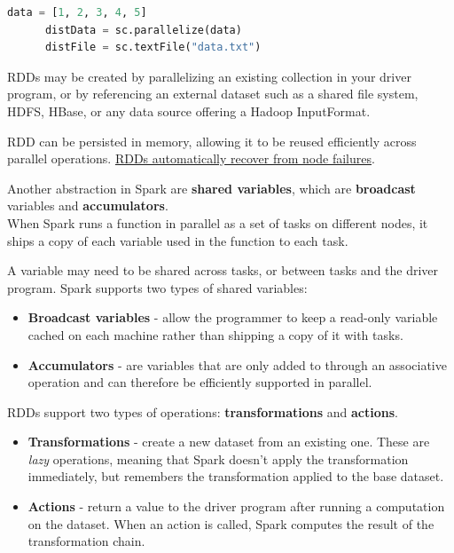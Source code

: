 \begin{paracol}{2}
   \begin{lstlisting}[language=Python, caption={Creating an RDD}]
      data = [1, 2, 3, 4, 5]
      distData = sc.parallelize(data)
      distFile = sc.textFile("data.txt")
   \end{lstlisting}
   \switchcolumn
   RDDs may be created by parallelizing an existing collection in your driver program, or by referencing an external dataset such as a shared file system, HDFS, HBase, or any data source offering a Hadoop InputFormat.
\end{paracol}
   
RDD can be persisted in memory, allowing it to be reused efficiently across parallel operations.
\ul{RDDs automatically recover from node failures}.
\nl

Another abstraction in Spark are \textbf{shared variables}, which are \textbf{broadcast} variables and \textbf{accumulators}.\\
When Spark runs a function in parallel as a set of tasks on different nodes, it ships a copy of each variable used in the function to each task.
{A variable may need to be shared across tasks, or between tasks and the driver program. Spark supports two types of shared variables:\ns
\begin{itemize}
   \item \textbf{Broadcast variables} - allow the programmer to keep a read-only variable cached on each machine rather than shipping a copy of it with tasks.
   \item \textbf{Accumulators} - are variables that are only added to through an associative operation and can therefore be efficiently supported in parallel.
\end{itemize}}

{RDDs support two types of operations: \textbf{transformations} and \textbf{actions}.\ns
\begin{itemize}
   \item \textbf{Transformations} - create a new dataset from an existing one. These are \textit{lazy} operations, meaning that Spark doesn't apply the transformation immediately, but remembers the transformation applied to the base dataset.
   \item \textbf{Actions} - return a value to the driver program after running a computation on the dataset.
   When an action is called, Spark computes the result of the transformation chain.
\end{itemize}}

